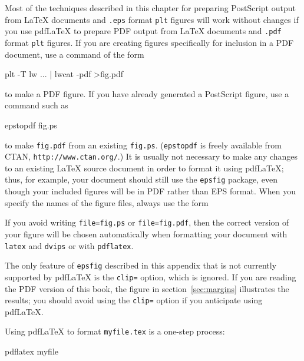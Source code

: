\documentclass{book}
\begin{document}
Most of the techniques described in this chapter for preparing PostScript
output from \LaTeX{} documents and {\tt .eps} format {\tt plt} figures
will work without changes if you use pdf\LaTeX{} to prepare PDF output
from \LaTeX{} documents and {\tt .pdf} format {\tt plt} figures.  If you
are creating figures specifically for inclusion in a PDF document, use
a command of the form
\begin{center}
\begin{boxedverbatim}
plt -T lw ... | lwcat -pdf >fig.pdf
\end{boxedverbatim}
\end{center}
to make a PDF figure.  If you have already generated a PostScript figure,
use a command such as
\begin{center}
\begin{boxedverbatim}
epstopdf fig.ps
\end{boxedverbatim}
\end{center}
to make {\tt fig.pdf} from an existing {\tt fig.ps}.  ({\tt epstopdf} is
freely available from CTAN, {\tt http://www.ctan.org/}.)  It is usually
not necessary to make any changes to an existing \LaTeX{} source document
in order to format it using pdf\LaTeX{};  thus, for example, your document
should still use the {\tt epsfig} package, even though your included figures
will be in PDF rather than EPS format.  When you specify the names of the
figure files, always use the form
\begin{center}
\begin{boxedverbatim}
\end{boxedverbatim}
\end{center}
If you avoid writing {\tt file=fig.ps} or {\tt file=fig.pdf}, then the
correct version of your figure will be chosen automatically when formatting
your document with {\tt latex} and {\tt dvips} or with {\tt pdflatex}.

The only feature of {\tt epsfig} described in this appendix that is
not currently supported by pdf\LaTeX{} is the {\tt clip=} option,
which is ignored.  If you are reading the PDF version of this book,
the figure in section~\ref{sec:margins} illustrates the results; you
should avoid using the {\tt clip=} option if you anticipate using
pdf\LaTeX{}.

Using pdf\LaTeX{} to format {\tt myfile.tex} is a one-step process:
\begin{center}
\begin{boxedverbatim}
pdflatex myfile
\end{boxedverbatim}
\end{center}
\end{document}
